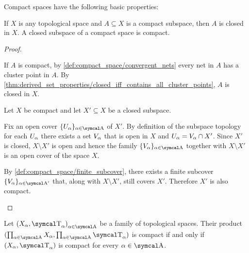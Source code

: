 \begin{proposition}\label{thm:compact_space_properties}
  Compact spaces have the following basic properties:
  \begin{propenum}
     If \( X \) is any topological space and \( A \subseteq X \) is a compact subspace, then \( A \) is closed in \( X \).
     A closed subspace of a compact space is compact.
  \end{propenum}
\end{proposition}
\begin{proof}
  \begin{description}
     If \( A \) is compact, by \cref{def:compact_space/convergent_nets} every net in \( A \) has a cluster point in \( A \). By \cref{thm:derived_set_properties/closed_iff_contains_all_cluster_points}, \( A \) is closed in \( X \).

     Let \( X \) be compact and let \( X' \subseteq X \) be a closed subspace.

    Fix an open cover \( \{ U_\al \}_{\al \in \CA} \) of \( X' \). By definition of the subspace topology for each \( U_\alpha \) there exists a set \( V_\alpha \) that is open in \( X \) and \( U_\alpha = V_\alpha \cap X' \). Since \( X' \) is closed, \( X \setminus X' \) is open and hence the family \( \{ V_\al \}_{\al \in \CA} \) together with \( X \setminus X' \) is an open cover of the space \( X \).

    By \cref{def:compact_space/finite_subcover}, there exists a finite subcover \( \{ V_\al \}_{\al \in \CA'} \) that, along with \( X \setminus X' \), still covers \( X' \). Therefore \( X' \) is also compact.
  \end{description}
\end{proof}

\begin{theorem}\label{thm:tychonoffs_product_theorem}\cite[theorem 3.2.4]{Engelking1989}
  Let \( { (X_\al, \CT_\al) }_{\al \in \CA} \) be a family of topological spaces. Their product \( (\prod_{\al \in \CA} X_\al, \prod_{\al \in \CA} \CT_\al) \) is compact if and only if \( (X_\al, \CT_\al) \) is compact for every \( \al \in \CA \).
\end{theorem}

